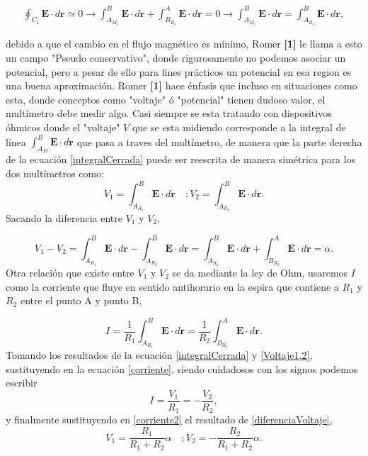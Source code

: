 \documentclass[a0,portrait]{a0poster}
\begin{document}
\begin{multicols}{2}
\begin{equation}
    \begin{split}
        \oint_{C_1} \mathbf{E} \cdot d\mathbf{r}  \simeq  0 \longrightarrow \int_{A_{M_1}}^{B} \mathbf{E} \cdot d\mathbf{r}+ \int_{B_{R_1}}^{A} \mathbf{E} \cdot d\mathbf{r}=0   \longrightarrow \int_{A_{M_1}}^{B} \mathbf{E} \cdot d\mathbf{r} = \int_{A_{R_1}}^{B} \mathbf{E} \cdot d\mathbf{r},
    \end{split}
    \label{integralCerrada}
\end{equation}

debido a que el cambio en el flujo magnético es mínimo, Romer \textbf{[{1}]}  le llama a esto un campo "Pseudo conservativo", donde rigurosamente no podemos asociar un potencial, pero a pesar de ello para fines prácticos un potencial en esa region es una buena aproximación. Romer \textbf{[{1}]} hace énfasis que incluso  en situaciones como esta, donde conceptos como "voltaje"  ó "potencial" tienen dudoso valor, el multímetro debe medir algo. Casi siempre se esta tratando con dispositivos óhmicos donde el "voltaje" $V$ que se esta midiendo corresponde a la integral de línea $\int_{A_{M}}^{B} \mathbf{E} \cdot d\mathbf{r}$ que pasa a traves del multímetro, de manera que la parte derecha de la ecuación \ref{integralCerrada} puede ser reescrita de manera simétrica para los dos multímetros como:
\begin{equation}
    V_1 = \int_{A_{R_1}}^{B} \mathbf{E} \cdot d\mathbf{r} \quad ; V_2=\int_{A_{R_2}}^{B} \mathbf{E} \cdot d\mathbf{r}.
    \label{Voltaje1,2}
\end{equation}
Sacando la diferencia entre $V_1$ y $V_2$,


\begin{equation}
    V_1 - V_2 =\int_{A_{R_1}}^{B} \mathbf{E} \cdot d\mathbf{r} - \int_{A_{R_2}}^{B} \mathbf{E} \cdot d\mathbf{r} = \int_{A_{R_1}}^{B} \mathbf{E} \cdot d\mathbf{r} + \int_{B_{R_2}}^{A} \mathbf{E} \cdot d\mathbf{r} = \alpha.
    \label{diferenciaVoltaje}
\end{equation}
Otra relación que existe entre $V_1$ y $V_2$ se da mediante la ley de Ohm, usaremos $I$ como la corriente que fluye en sentido antihorario en la espira que contiene a $R_1$ y $R_2$ entre el punto A y punto B,

\begin{equation}
    I = \frac{1}{R_1} \int_{A_{R_1}}^{B} \mathbf{E} \cdot d\mathbf{r} =  \frac{1}{R_2}\int_{B_{R_2}}^{A} \mathbf{E} \cdot d\mathbf{r}.
    \label{corriente}
\end{equation}
Tomando los resultados de la ecuación \ref{integralCerrada} y \ref{Voltaje1,2}, sustituyendo en la ecuación \ref{corriente}, siendo cuidadosos con los signos podemos escribir
\begin{equation}
    I = \frac{V_1}{R_1} = -\frac{V_2}{R_2}, 
    \label{corriente2}
\end{equation}
y finalmente sustituyendo en \ref{corriente2} el resultado de \ref{diferenciaVoltaje},
\begin{equation}
    V_1 = \frac{R_1}{R_1 + R_2} \alpha \quad ; V_2=-\frac{R_2}{R_1 + R_2} \alpha.
    \label{eq:}
\end{equation}


\end{multicols}
\end{document}
